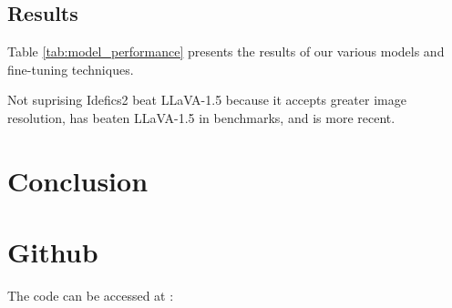 \documentclass{article}
\begin{document}
\subsection{Results}

Table \ref{tab:model_performance} presents the results of our various models and fine-tuning techniques.


Not suprising Idefics2 beat LLaVA-1.5 because it accepts greater image resolution, has beaten LLaVA-1.5 in benchmarks, and is more recent. 


\section{Conclusion}
\label{sec:conclusion}




\vfill\pagebreak





\section{Github}

The code can be accessed at :
\end{document}
